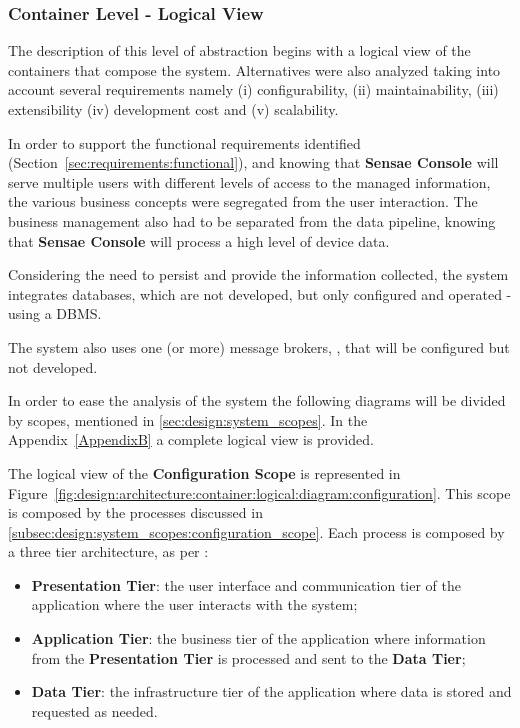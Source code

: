 \subsubsection{Container Level - Logical View}
\label{subsubsec:design:architecture:container:logical}

The description of this level of abstraction begins with a logical view of the containers that compose the system. Alternatives were also analyzed taking into account several requirements namely (i) configurability, (ii) maintainability, (iii) extensibility (iv) development cost and (v) scalability.

In order to support the functional requirements identified (Section~\ref{sec:requirements:functional}), and knowing that \textbf{Sensae Console} will serve multiple users with different levels of access to the managed information, the various business concepts were segregated from the user interaction. The business management also had to be separated from the  data pipeline, knowing that \textbf{Sensae Console} will process a high level of device data.

Considering the need to persist and provide the information collected, the system integrates databases, which are not developed, but only configured and operated - using a \gls{DBMS}.

The system also uses one (or more) message brokers, \cite{broker}, that will be configured but not developed.

In order to ease the analysis of the system the following diagrams will be divided by scopes, mentioned in \ref{sec:design:system_scopes}. In the Appendix~\ref{AppendixB} a complete logical view is provided.

The logical view of the \textbf{Configuration Scope} is represented in Figure~\ref{fig:design:architecture:container:logical:diagram:configuration}. This scope is composed by the processes discussed in \ref{subsec:design:system_scopes:configuration_scope}. Each process is composed by a three tier architecture, as per \cite{3tier}:

\begin{itemize}
   \item \textbf{Presentation Tier}: the user interface and communication tier of the application where the user interacts with the system;
   \item \textbf{Application Tier}: the business tier of the application where information from the \textbf{Presentation Tier} is processed and sent to the \textbf{Data Tier};
   \item \textbf{Data Tier}: the infrastructure tier of the application where data is stored and requested as needed. 
\end{itemize}

